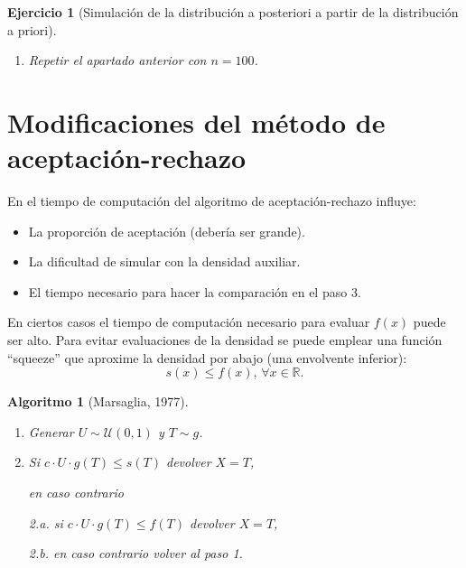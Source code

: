 \documentclass[
]{book}
\theoremstyle{break}
\newtheorem{conjecture}{Algoritmo}[chapter]
\newtheorem{exercise}{Ejercicio}[chapter]
\theoremstyle{nonumberplain}
\begin{document}
\begin{exercise}[Simulación de la distribución a posteriori a partir de la distribución a priori]
\begin{enumerate}
  \begin{figure}[!htb]

  {\centering \texttt{[image: 04-Metodos\_generales\_continuas\_files/figure-latex/ic-bayes-1]} 

  }

  \caption{Distribución de los valores generados y aproximación del intervalo de credibilidad.}\label{fig:ic-bayes}
  \end{figure}
\item
  Repetir el apartado anterior con \(n=100\).
\end{enumerate}

\end{exercise}

\hypertarget{modAR}{%
\section{Modificaciones del método de aceptación-rechazo}\label{modAR}}

En el tiempo de computación del algoritmo de aceptación-rechazo influye:

\begin{itemize}
\item
  La proporción de aceptación (debería ser grande).
\item
  La dificultad de simular con la densidad auxiliar.
\item
  El tiempo necesario para hacer la comparación en el paso 3.
\end{itemize}

En ciertos casos el tiempo de computación necesario para evaluar \(f(x)\) puede ser alto.
Para evitar evaluaciones de la densidad se puede emplear una función ``squeeze'' que aproxime la densidad por abajo (una envolvente inferior):
\[s(x)\leq f(x) \text{, }\forall x\in \mathbb{R}.\]

\begin{conjecture}[Marsaglia, 1977]
\protect\hypertarget{cnj:marsaglia}{}\label{cnj:marsaglia}

\begin{enumerate}
\def\labelenumi{\arabic{enumi}.}
\item
  Generar \(U \sim \mathcal{U}(0, 1)\) y \(T\sim g\).
\item
  Si \(c\cdot U\cdot g\left( T\right) \leq s\left( T\right)\) devolver \(X=T\),

  en caso contrario

  2.a. si \(c\cdot U\cdot g\left( T\right) \leq f\left( T\right)\)
  devolver \(X=T\),

  2.b. en caso contrario volver al paso 1.
\end{enumerate}

\end{conjecture}
\end{document}
